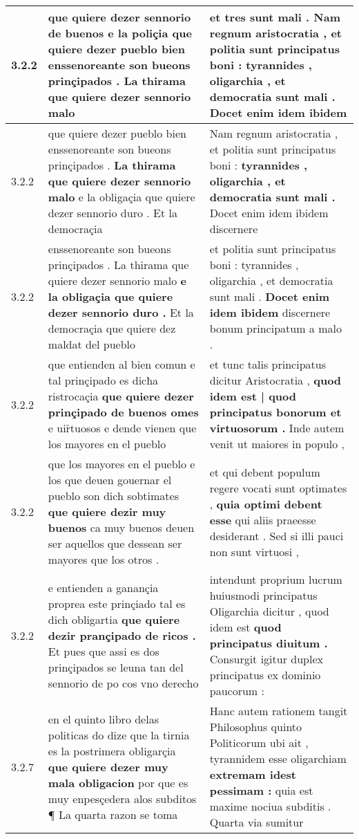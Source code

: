 \begin{tabular}{|p{1cm}|p{6.5cm}|p{6.5cm}|}
3.2.2 & que quiere dezer sennorio de buenos e la poliçia \textbf{ que quiere dezer pueblo bien } enssenoreante son bueons prinçipados . La thirama que quiere dezer sennorio malo & et tres sunt mali . Nam regnum aristocratia , \textbf{ et politia sunt principatus boni : } tyrannides , oligarchia , et democratia sunt mali . Docet enim idem ibidem \\\hline
3.2.2 & que quiere dezer pueblo bien enssenoreante son bueons prinçipados . \textbf{ La thirama que quiere dezer sennorio malo } e la obligaçia que quiere dezer sennorio duro . Et la democraçia & Nam regnum aristocratia , et politia sunt principatus boni : \textbf{ tyrannides , oligarchia , et democratia sunt mali . } Docet enim idem ibidem discernere \\\hline
3.2.2 & enssenoreante son bueons prinçipados . La thirama que quiere dezer sennorio malo \textbf{ e la obligaçia que quiere dezer sennorio duro . } Et la democraçia que quiere dez maldat del pueblo & et politia sunt principatus boni : tyrannides , oligarchia , et democratia sunt mali . \textbf{ Docet enim idem ibidem } discernere bonum principatum a malo . \\\hline
3.2.2 & que entienden al bien comun e tal prinçipado es dicħa ristrocaçia \textbf{ que quiere dezer prinçipado de buenos omes } e uir̉tuosos e dende vienen que los mayores en el pueblo & et tunc talis principatus dicitur Aristocratia , \textbf{ quod idem est | quod principatus bonorum et virtuosorum . } Inde autem venit ut maiores in populo , \\\hline
3.2.2 & que los mayores en el pueblo e los que deuen gouernar el pueblo son dich sobtimates \textbf{ que quiere dezir muy buenos } ca muy buenos deuen ser aquellos que dessean ser mayores que los otros . & et qui debent populum regere vocati sunt optimates , \textbf{ quia optimi debent esse } qui aliis praeesse desiderant . Sed si illi pauci non sunt virtuosi , \\\hline
3.2.2 & e entienden a ganançia proprea este prinçiado tal es dich obligartia \textbf{ que quiere dezir prançipado de ricos . } Et pues que assi es dos prinçipados se leuna tan del sennorio de po cos vno derecho & intendunt proprium lucrum huiusmodi principatus Oligarchia dicitur , quod idem est \textbf{ quod principatus diuitum . } Consurgit igitur duplex principatus ex dominio paucorum : \\\hline
3.2.7 & en el quinto libro delas politicas do dize que la tirnia es la postrimera obligarçia \textbf{ que quiere dezer muy mala obligacion } por que es muy enpesçedera alos subditos ¶ La quarta razon se toma & Hanc autem rationem tangit Philosophus quinto Politicorum ubi ait , tyrannidem esse oligarchiam \textbf{ extremam idest pessimam : } quia est maxime nociua subditis . Quarta via sumitur \\\hline

\end{tabular}
